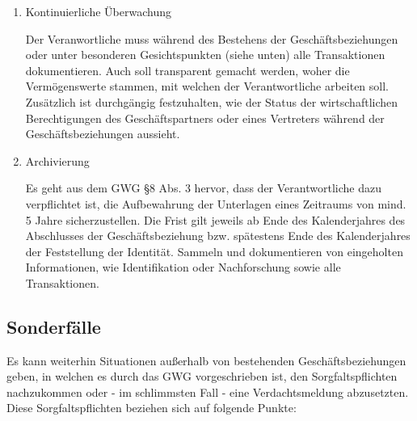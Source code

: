 \documentclass{article}
\begin{document}
        \begin{enumerate}

            \item Kontinuierliche Überwachung

                Der Veranwortliche muss während des Bestehens der Geschäftsbeziehungen oder unter besonderen Gesichtspunkten (siehe unten) alle Transaktionen dokumentieren. Auch soll transparent gemacht werden, woher die Vermögenswerte stammen, mit welchen der Verantwortliche arbeiten soll.
                Zusätzlich ist durchgängig festzuhalten, wie der Status der wirtschaftlichen Berechtigungen des Geschäftspartners oder eines Vertreters während der Geschäftsbeziehungen aussieht.

            \item Archivierung

                Es geht aus dem GWG \cite{GwG} §8 Abs. 3 hervor, dass der Verantwortliche dazu verpflichtet ist, die Aufbewahrung der Unterlagen eines Zeitraums von mind. 5 Jahre sicherzustellen.
                Die Frist gilt jeweils ab Ende des Kalenderjahres des Abschlusses der Geschäftsbeziehung bzw. spätestens Ende des Kalenderjahres der Feststellung der Identität.
                Sammeln und dokumentieren von eingeholten Informationen, wie Identifikation oder Nachforschung sowie alle Transaktionen.

        \end{enumerate}  


        \subsection[Sonderfälle]{Sonderfälle}

        Es kann weiterhin Situationen außerhalb von bestehenden Geschäftsbeziehungen geben, in welchen es durch das GWG vorgeschrieben ist, den Sorgfaltspflichten nachzukommen oder - im schlimmsten Fall - eine Verdachtsmeldung abzusetzten. Diese Sorgfaltspflichten beziehen sich auf folgende Punkte:
\end{document}
